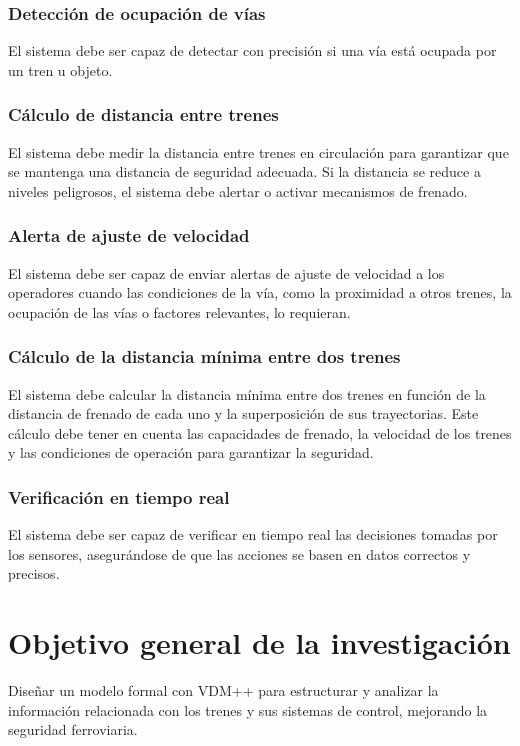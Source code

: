 \documentclass[journal]{IEEEtran}
\begin{document}
\subsubsection{Detección de ocupación de vías}  
El sistema debe ser capaz de detectar con precisión si una vía está ocupada por un tren u objeto.

\subsubsection{Cálculo de distancia entre trenes}  
El sistema debe medir la distancia entre trenes en circulación para garantizar que se mantenga una distancia de seguridad adecuada. Si la distancia se reduce a niveles peligrosos, el sistema debe alertar o activar mecanismos de frenado.

\subsubsection{Alerta de ajuste de velocidad}  
El sistema debe ser capaz de enviar alertas de ajuste de velocidad a los operadores cuando las condiciones de la vía, como la proximidad a otros trenes, la ocupación de las vías o factores relevantes, lo requieran.

\subsubsection{Cálculo de la distancia mínima entre dos trenes}  
El sistema debe calcular la distancia mínima entre dos trenes en función de la distancia de frenado de cada uno y la superposición de sus trayectorias. Este cálculo debe tener en cuenta las capacidades de frenado, la velocidad de los trenes y las condiciones de operación para garantizar la seguridad.

\subsubsection{Verificación en tiempo real}  
El sistema debe ser capaz de verificar en tiempo real las decisiones tomadas por los sensores, asegurándose de que las acciones se basen en datos correctos y precisos.

\section{Objetivo general de la investigación}  
Diseñar un modelo formal con VDM++ para estructurar y analizar la información relacionada con los trenes y sus sistemas de control, mejorando la seguridad ferroviaria.
\end{document}
